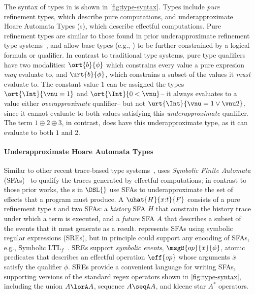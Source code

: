 The syntax of types in \DSL{} is shown in \autoref{fig:type-syntax}.
Types include \emph{pure} refinement types, which describe pure
computations, and underapproximate Hoare Automata Types (\tyName{}s),
which describe effectful computations.
Pure refinement types are similar to those found in prior
underapproximate refinement type systems~\cite{CoverageType}, and
allow base types (e.g., {}) to be further constrained by a
logical formula or qualifier. In contrast to traditional type systems,
pure type qualifiers have two modalities: $\ort{b}{\phi}$ which
constrains every value a pure expresion \emph{may} evaluate to, and
$\urt{b}{\phi}$, which constrains a subset of the values it
\emph{must} evaluate to. The constant value $1$ can be assigned the
types $\ort{\Int}{\vnu = 1}$ and $\ort{\Int}{0 < \vnu}$-- it always
evaluates to a value either \emph{overapproximate} qualifier-- but not
$\urt{\Int}{\vnu = 1 \lor \vnu 2}$, since it cannot evaluate to both
values satisfying this \emph{underapproximate} qualifier. The term
$1 \oplus 2 \oplus 3$, in contrast, does have this underapproximate
type, as it can evaluate to both $1$ and $2$.

\paragraph{Underapproximate Hoare Automata Types}

Similar to other recent trace-based type systems~\cite{ZYDJ24}, \DSL{}
uses \emph{Symbolic Finite Automata} (SFAs)~\cite{Vea13,
  SFA-minimization, SFA-Transducers} to qualify the traces generated
by effectful computations; in contrast to those prior works, the
\tyName{}s in $\DSL{}$ use SFAs to underapproximate the set of effects
that a program must produce. A \tyName{} $\uhat{H}{x{:}t}{F}$ consists
of a pure refinement type $t$ and two SFAs: a \emph{history} SFA $H$
that constrain the history trace under which a term is executed, and a
\emph{future} SFA $A$ that describes a subset of the events that it
must generate as a result. \tyName{} represents SFAs using symbolic
regular expressions (SREs), but in principle could support any
encoding of SFAs, e.g., Symbolic LTL$_f$~\cite{LTLf}. SREs support
\emph{symbolic events}, $\msgB{op}{\overline{x}}{\phi}$, atomic
predicates that describes an effectful operation {$\eff{op}$} whose
arguments $\overline{x}$ satisfy the qualifier $\phi$. SREs provide a
convenient language for writing SFAs, supporting versions of the
standard regex operators shown in \autoref{fig:type-syntax}, including
the union $A \lorA A$, sequence $A \seqA A$, and kleene star $A^*$
operators.

